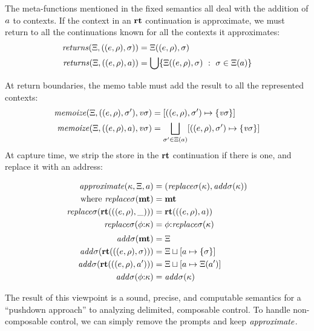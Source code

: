 The meta-functions mentioned in the fixed semantics all deal with the addition of $a$ to contexts.
%
If the context in an $\mathbf{rt}$ continuation is approximate, we must return to all the continuations known for all the contexts it approximates:
\begin{align*}
  \mathit{returns}(\Xi, ((e,\rho), \sigma)) &= \Xi((e,\rho), \sigma) \\
  \mathit{returns}(\Xi, ((e,\rho), a)) &=
    \bigcup\{ \Xi((e,\rho),\sigma)\ :\ \sigma \in \Xi(a)\}
\end{align*}

At return boundaries, the memo table must add the result to all the represented contexts:
\begin{align*}
  \mathit{memoize}(\Xi, ((e,\rho), \sigma'), \mathit{v\sigma}) &=
  [((e,\rho), \sigma') \mapsto \{ {\mathit{v\sigma}} \}] \\
  \mathit{memoize}(\Xi, ((e,\rho), a), \mathit{v\sigma}) &=
  \bigsqcup\limits_{\sigma' \in \Xi(a)}[((e,\rho), \sigma') \mapsto \{ \mathit{v\sigma} \}]
\end{align*}
At capture time, we strip the store in the $\mathbf{rt}$ continuation if there is one, and replace it with an address:

\newcommand{\replacectx}{\mathit{replace}\mstore}
\newcommand{\addstore}{\mathit{add}\mstore}
\begin{align*}
  \approximate(\mkont, \mktab, \maddr) &= (\replacectx(\mkont), \addstore(\mkont)) \\
  \text{where }
   \replacectx(\kmt) &= \kmt \\
   \replacectx(\krt{((\mexpr,\menv),\_)}) &= \krt{((\mexpr,\menv),\maddr)} \\
   \replacectx(\kcons{\mkframe}{\mkont}) &= \kcons{\mkframe}{\replacectx(\mkont)}
  \\[2pt]
   \addstore(\kmt) &= \mktab \\
   \addstore(\krt{((\mexpr,\menv),\mstore)}) &= \joinone{\mktab}{\maddr}{\mstore} \\
   \addstore(\krt{((\mexpr,\menv),\maddr')}) &= \joinm{\mktab}{\maddr}{\mktab(\maddr')} \\
   \addstore(\kcons{\mkframe}{\mkont}) &= \addstore(\mkont)
\end{align*}

The result of this viewpoint is a sound, precise, and computable semantics for a ``pushdown approach'' to analyzing delimited, composable control.
%
To handle non-composable control, we can simply remove the prompts and keep $\mathit{approximate}$.

